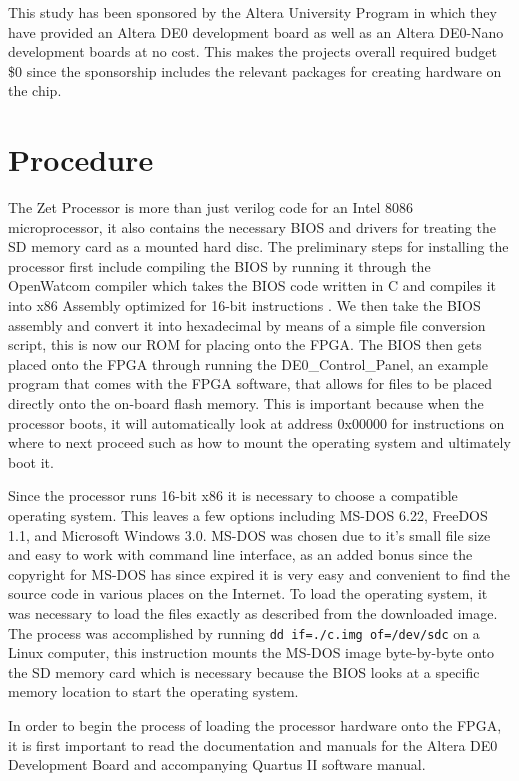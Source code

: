 \documentclass[conference]{IEEEtran}
\begin{document}
This study has been sponsored by the Altera University Program in which they have provided an Altera DE0 development board as well as an Altera DE0-Nano development boards at no cost. This makes the projects overall required budget \$0 since the sponsorship includes the relevant packages for creating hardware on the chip.

\section{Procedure}
The Zet Processor is more than just verilog code for an Intel 8086 microprocessor, it also contains the necessary BIOS and drivers for treating the SD memory card as a mounted hard disc. The preliminary steps for installing the processor first include compiling the BIOS by running it through the OpenWatcom compiler which takes the BIOS code written in C and compiles it into x86 Assembly optimized for 16-bit instructions \cite{Watcom}. We then take the BIOS assembly and convert it into hexadecimal by means of a simple file conversion script, this is now our ROM for placing onto the FPGA. The BIOS then gets placed onto the FPGA through running the DE0\_Control\_Panel, an example program that comes with the FPGA software, that allows for files to be placed directly onto the on-board flash memory. This is important because when the processor boots, it will automatically look at address 0x00000 for instructions on where to next proceed such as how to mount the operating system and ultimately boot it. 

Since the processor runs 16-bit x86 it is necessary to choose a compatible operating system. This leaves a few options including MS-DOS 6.22, FreeDOS 1.1, and Microsoft Windows 3.0. MS-DOS was chosen due to it's small file size and easy to work with command line interface, as an added bonus since the copyright for MS-DOS has since expired it is very easy and convenient to find the source code in various places on the Internet. To load the operating system, it was necessary to load the files exactly as described from the downloaded image. The process was accomplished by running {\tt dd if=./c.img of=/dev/sdc} on a Linux computer, this instruction mounts the MS-DOS image byte-by-byte onto the SD memory card which is necessary because the BIOS looks at a specific memory location to start the operating system.

In order to begin the process of loading the processor hardware onto the FPGA, it is first important to read the documentation and manuals for the Altera DE0 Development Board and accompanying Quartus II software manual. 
\end{document}
